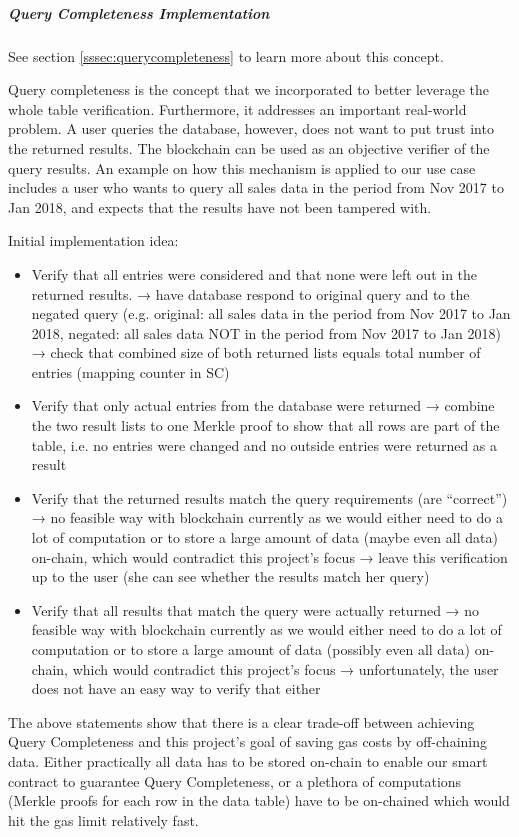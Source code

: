 \subparagraph{Query Completeness Implementation}

See section \ref{sssec:querycompleteness} to learn more about this concept.

Query completeness is the concept that we incorporated to better leverage the whole table verification. Furthermore, it addresses an important real-world problem. A user queries the database, however, does not want to put trust into the returned results. The blockchain can be used as an objective verifier of the query results. An example on how this mechanism is applied to our use case includes a user who wants to query all sales data in the period from Nov 2017 to Jan 2018, and expects that the results have not been tampered with.

Initial implementation idea:
\begin{itemize}
\item Verify that all entries were considered and that none were left out in the returned results.
→  have database respond to original query and to the negated query (e.g. original: all sales data in the period from Nov 2017 to Jan 2018, negated: all sales data NOT in the period from Nov 2017 to Jan 2018)
→ check that combined size of both returned lists equals total number of entries (mapping counter in SC)
\item Verify that only actual entries from the database were returned
→ combine the two result lists to one Merkle proof to show that all rows are part of the table, i.e. no entries were changed and no outside entries were returned as a result
\item Verify that the returned results match the query requirements (are “correct”)
→ no feasible way with blockchain currently as we would either need to do a lot of computation or to store a large amount of data (maybe even all data) on-chain, which would contradict this project’s focus
→ leave this verification up to the user (she can see whether the results match her query)
\item Verify that all results that match the query were actually returned
→ no feasible way with blockchain currently as we would either need to do a lot of computation or to store a large amount of data (possibly even all data) on-chain, which would contradict this project’s focus
→ unfortunately, the user does not have an easy way to verify that either
\end{itemize}

The above statements show that there is a clear trade-off between achieving Query Completeness and this project’s goal of saving gas costs by off-chaining data. Either practically all data has to be stored on-chain to enable our smart contract to guarantee Query Completeness, or a plethora of computations (Merkle proofs for each row in the data table) have to be on-chained which would hit the gas limit relatively fast.

